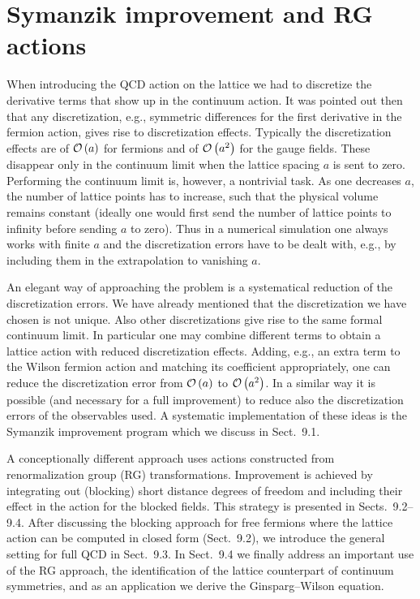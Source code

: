 
\chapter{Symanzik improvement and RG actions}

When introducing the QCD action on the lattice we had to discretize the
derivative terms that show up in the continuum action. It was pointed out
then that any discretization, e.g., symmetric differences for the first
derivative in the fermion action, gives rise to discretization effects.
Typically the discretization effects are of $\mathcal{O}\left(a\right)$ for fermions and of
$\mathcal{O}\left(a^2\right)$ for the gauge fields. These disappear only in the continuum
limit when the lattice spacing $a$ is sent to zero. Performing the continuum
limit is, however, a nontrivial task. As one decreases $a$, the number of
lattice points has to increase, such that the physical volume remains constant
(ideally one would first send the number of lattice points to infinity before
sending $a$ to zero). Thus in a numerical simulation one always works with
finite $a$ and the discretization errors have to be dealt with, e.g., by
including them in the extrapolation to vanishing $a$.

An elegant way of approaching the problem is a systematical reduction of the
discretization errors. We have already mentioned that the discretization we
have chosen is not unique. Also other discretizations give rise to the same
formal continuum limit. In particular one may combine different terms to
obtain a lattice action with reduced discretization effects. Adding, e.g., an
extra term to the Wilson fermion action and matching its coefficient
appropriately, one can reduce the discretization error from $\mathcal{O}\left(a\right)$ to
$\mathcal{O}\left(a^2\right)$. In a similar way it is possible (and necessary for a full
improvement) to reduce also the discretization errors of the observables used.
A systematic implementation of these ideas is the Symanzik improvement program
which we discuss in Sect.~9.1.

A conceptionally different approach uses actions constructed from
renormalization group (RG) transformations. Improvement is achieved by
integrating out (blocking) short distance degrees of freedom and including
their effect in the action for the blocked fields. This strategy is presented
in Sects.~9.2--9.4. After discussing the blocking approach for free fermions
where the lattice action can be computed in closed form (Sect.~9.2), we
introduce the general setting for full QCD in Sect.~9.3. In Sect.~9.4 we
finally address an important use of the RG approach, the identification of the
lattice counterpart of continuum symmetries, and as an application we derive
the Ginsparg--Wilson equation.

